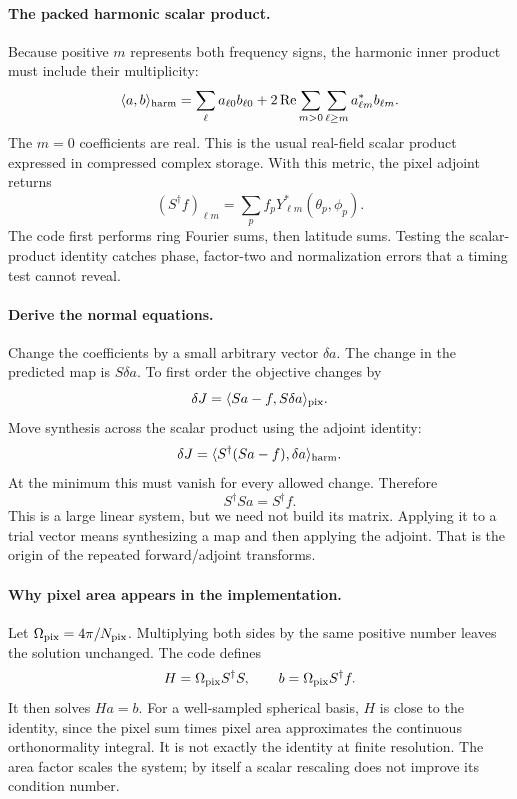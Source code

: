 \paragraph{The packed harmonic scalar product.}
Because positive $m$ represents both frequency signs, the harmonic inner
product must include their multiplicity:
\begin{equation}
 \langle a,b\rangle_{\rm harm}
 =\sum_{\ell}a_{\ell0}b_{\ell0}
 +2\operatorname{Re}\sum_{m>0}\sum_{\ell\ge m}a_{\ell m}^{*}b_{\ell m}.
\end{equation}
The $m=0$ coefficients are real. This is the usual real-field scalar
product expressed in compressed complex storage. With this metric, the
pixel adjoint returns
\begin{equation}
 (S^\dagger f)_{\ell m}=\sum_p f_p Y_{\ell m}^{*}(\theta_p,\phi_p).
\end{equation}
The code first performs ring Fourier sums, then latitude sums. Testing the
scalar-product identity catches phase, factor-two and normalization errors
that a timing test cannot reveal.

\paragraph{Derive the normal equations.}
Change the coefficients by a small arbitrary vector $\delta a$. The change
in the predicted map is $S\delta a$. To first order the objective changes by
\begin{equation}
 \delta J=\langle Sa-f,S\delta a\rangle_{\rm pix}.
\end{equation}
Move synthesis across the scalar product using the adjoint identity:
\begin{equation}
 \delta J=\langle S^\dagger(Sa-f),\delta a\rangle_{\rm harm}.
\end{equation}
At the minimum this must vanish for every allowed change. Therefore
\begin{equation}
 S^\dagger S a=S^\dagger f.
\end{equation}
This is a large linear system, but we need not build its matrix. Applying
it to a trial vector means synthesizing a map and then applying the
adjoint. That is the origin of the repeated forward/adjoint transforms.

\paragraph{Why pixel area appears in the implementation.}
Let $\Omega_{\rm pix}=4\pi/N_{\rm pix}$. Multiplying both sides by the same
positive number leaves the solution unchanged. The code defines
\begin{equation}
 H=\Omega_{\rm pix}S^\dagger S,\qquad
 b=\Omega_{\rm pix}S^\dagger f.
\end{equation}
It then solves $Ha=b$. For a well-sampled spherical basis, $H$ is close to
the identity, since the pixel sum times pixel area approximates the
continuous orthonormality integral. It is not exactly the identity at
finite resolution. The area factor scales the system; by itself a scalar
rescaling does not improve its condition number.

